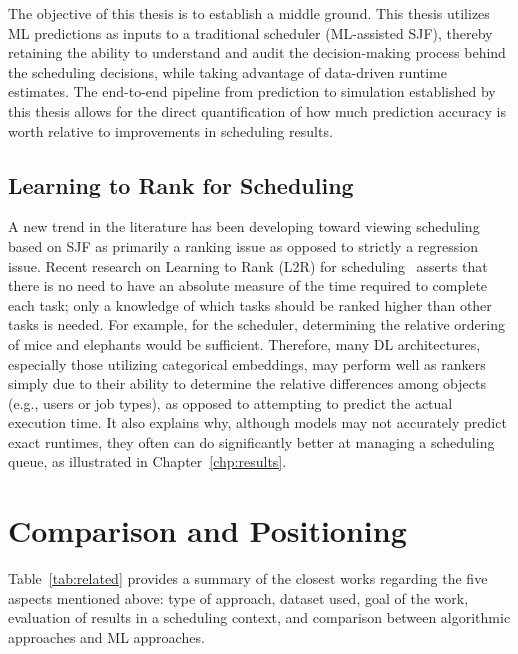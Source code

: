 The objective of this thesis is to establish a middle ground. This thesis utilizes ML predictions as inputs to a traditional scheduler (ML-assisted SJF), thereby retaining the ability to understand and audit the decision-making process behind the scheduling decisions, while taking advantage of data-driven runtime estimates. The end-to-end pipeline from prediction to simulation established by this thesis allows for the direct quantification of how much prediction accuracy is worth relative to improvements in scheduling results.

\subsection{Learning to Rank for Scheduling}

A new trend in the literature has been developing toward viewing scheduling based on SJF as primarily a ranking issue as opposed to strictly a regression issue. Recent research on Learning to Rank (L2R) for scheduling~\cite{fu2024efficient} asserts that there is no need to have an absolute measure of the time required to complete each task; only a knowledge of which tasks should be ranked higher than other tasks is needed. For example, for the scheduler, determining the relative ordering of mice and elephants would be sufficient. Therefore, many DL architectures, especially those utilizing categorical embeddings, may perform well as rankers simply due to their ability to determine the relative differences among objects (e.g., users or job types), as opposed to attempting to predict the actual execution time. It also explains why, although models may not accurately predict exact runtimes, they often can do significantly better at managing a scheduling queue, as illustrated in Chapter~\ref{chp:results}.

\section{Comparison and Positioning}

Table~\ref{tab:related} provides a summary of the closest works regarding the five aspects mentioned above: type of approach, dataset used, goal of the work, evaluation of results in a scheduling context, and comparison between algorithmic approaches and ML approaches.


